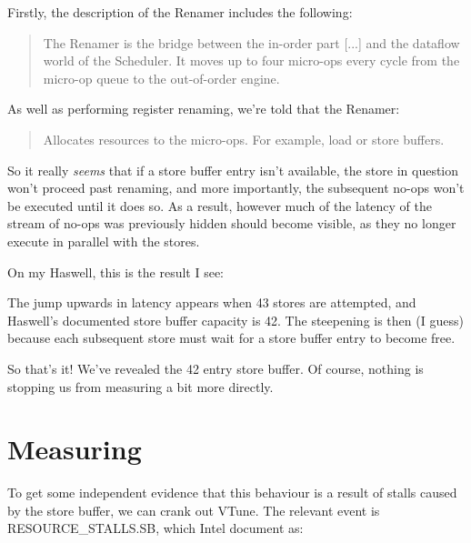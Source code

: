 \documentclass[11pt]{article}
\begin{document}
Firstly, the description of the Renamer includes the following:

\begin{quote}
The Renamer is the bridge between the in-order part [...] and the dataflow world of the Scheduler. It moves up to four micro-ops every cycle from the micro-op queue to the out-of-order engine.
\end{quote}

As well as performing register renaming, we're told that the Renamer:

\begin{quote}
Allocates resources to the micro-ops. For example, load or store buffers.
\end{quote}

So it really \emph{seems} that if a store buffer entry isn't available, the store in question won't proceed past renaming, and more importantly, the subsequent no-ops won't be executed until it does so. As a result, however much of the latency of the stream of no-ops was previously hidden should become visible, as they no longer execute in parallel with the stores. 

On my Haswell, this is the result I see:

\begin{center}\end{center}

The jump upwards in latency appears when 43 stores are attempted, and Haswell's documented store buffer capacity is 42. The steepening is then (I guess) because each subsequent store must wait for a store buffer entry to become free.

So that's it! We've revealed the 42 entry store buffer. Of course, nothing is stopping us from measuring a bit more directly.

\section{Measuring}

To get some independent evidence that this behaviour is a result of stalls caused by the store buffer, we can crank out VTune. The relevant event is RESOURCE\_STALLS.SB, which Intel document as:
\end{document}
